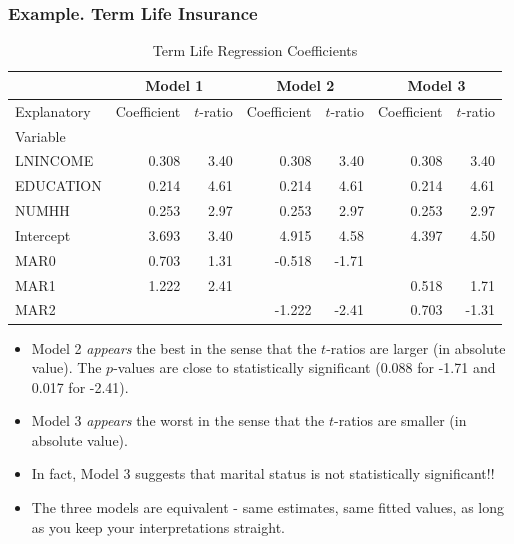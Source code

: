 \begin{frame}[shrink=10]
 \frametitle{Example. Term Life Insurance}
\begin{table}
 \caption{ Term Life Regression Coefficients}
\begin{tabular}{l|rr|rr|rr}
 \hline
 & \multicolumn{2}{c|}{Model 1}& \multicolumn{2}{c|}{Model 2}& \multicolumn{2}{c}{Model 3}\\
 \hline
 Explanatory & Coefficient & $t$-ratio & Coefficient & $t$-ratio& Coefficient &
 $t$-ratio\\
 Variable &&&&&&\\ \hline
LNINCOME & 0.308 & 3.40 & 0.308 & 3.40 & 0.308 & 3.40 \\
EDUCATION &0.214 & 4.61 &0.214 & 4.61&0.214 & 4.61 \\
NUMHH     & 0.253 & 2.97 & 0.253 & 2.97 & 0.253 & 2.97 \\\hline
Intercept & 3.693& 3.40& 4.915 & 4.58  & 4.397 & 4.50\\
MAR0    &  0.703 &  1.31 &-0.518& -1.71& &\\

MAR1 &  1.222 &   2.41 &  & &0.518 &1.71\\
MAR2 & & & -1.222 & -2.41 & 0.703& -1.31\\
 \hline
\end{tabular}
\end{table}
  \begin{itemize}
   \item Model 2 \emph{appears} the best in the sense that the $t$-ratios are
   larger (in absolute value). The $p$-values are close to
   statistically significant (0.088 for -1.71 and 0.017
   for -2.41).
\item Model 3 \emph{appears} the worst in the sense that the $t$-ratios are
   smaller (in absolute value).
   \item In fact, Model 3 suggests that marital status is not
   statistically significant!!
      \item The three models are equivalent - same estimates, same
      fitted values, as long as you keep your interpretations
      straight.
      \end{itemize}
\end{frame}




